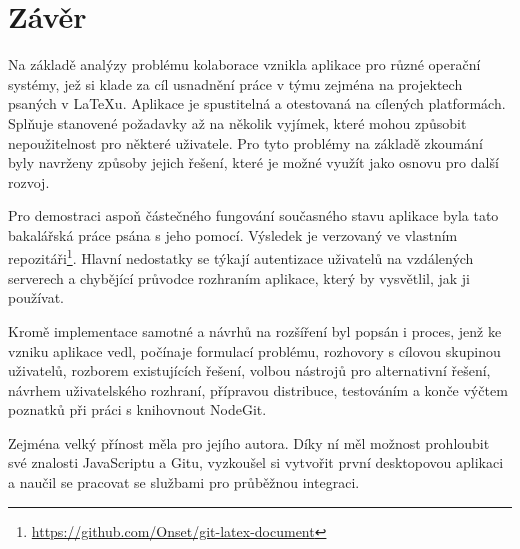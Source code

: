 \chapter{Závěr}

Na základě analýzy problému kolaborace vznikla aplikace pro různé operační systémy, jež si klade za cíl usnadnění práce v týmu zejména na projektech psaných v \LaTeX{u}. Aplikace je spustitelná a otestovaná na cílených platformách. Splňuje stanovené požadavky až na několik vyjímek, které mohou způsobit nepoužitelnost pro některé uživatele. Pro tyto problémy na základě zkoumání byly navrženy způsoby jejich řešení, které je možné využít jako osnovu pro další rozvoj.

Pro demostraci aspoň částečného fungování současného stavu aplikace byla tato bakalářská práce psána s jeho pomocí. Výsledek je verzovaný ve vlastním repozitáři\footnote{\url{https://github.com/Onset/git-latex-document}}. Hlavní nedostatky se týkají autentizace uživatelů na vzdálených serverech a chybějící průvodce rozhraním aplikace, který by vysvětlil, jak ji používat.

Kromě implementace samotné a návrhů na rozšíření byl popsán i proces, jenž ke vzniku aplikace vedl, počínaje formulací problému, rozhovory s cílovou skupinou uživatelů, rozborem existujících řešení, volbou nástrojů pro alternativní řešení, návrhem uživatelského rozhraní, přípravou distribuce, testováním a konče výčtem poznatků při práci s knihovnout NodeGit.

Zejména velký přínost měla pro jejího autora. Díky ní měl možnost prohloubit své znalosti JavaScriptu a Gitu, vyzkoušel si vytvořit první desktopovou aplikaci a naučil se pracovat se službami pro průběžnou integraci.